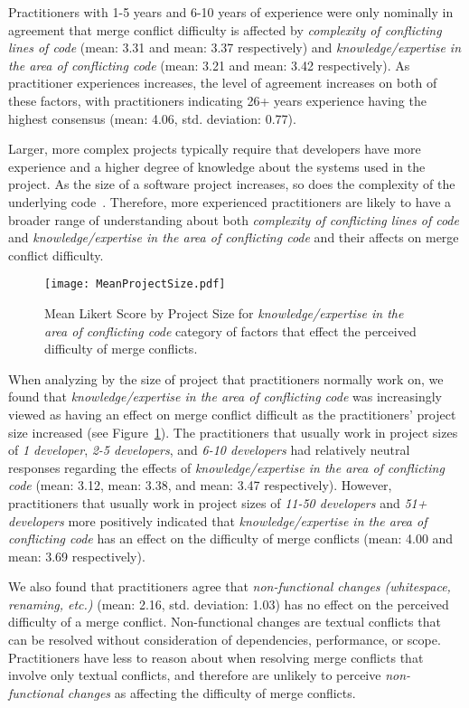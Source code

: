 Practitioners with 1-5 years and 6-10 years of experience were only nominally in agreement that merge conflict difficulty is affected by \textit{complexity of conflicting lines of code} (mean: 3.31 and mean: 3.37 respectively) and \textit{knowledge/expertise in the area of conflicting code} (mean: 3.21 and mean: 3.42 respectively).
As practitioner experiences increases, the level of agreement increases on both of these factors, with practitioners indicating 26+ years experience having the highest consensus (mean: 4.06, std. deviation: 0.77). 

Larger, more complex projects typically require that developers have more experience and a higher degree of knowledge about the systems used in the project.
As the size of a software project increases, so does the complexity of the underlying code~\cite{banker1993software}\cite{curtis1979third}.
Therefore, more experienced practitioners are likely to have a broader range of understanding about both \textit{complexity of conflicting lines of code} and \textit{knowledge/expertise in the area of conflicting code} and their affects on merge conflict difficulty.

\begin{figure}[!t]
\centering
\texttt{[image: MeanProjectSize.pdf]}
\caption{Mean Likert Score by Project Size for \textit{knowledge/expertise in the area of conflicting code} category of factors that effect the perceived difficulty of merge conflicts.}
\label{mean_likert_project_size}
\end{figure}

When analyzing by the size of project that practitioners normally work on, we found that \textit{knowledge/expertise in the area of conflicting code} was increasingly viewed as having an effect on merge conflict difficult as the practitioners' project size increased (see Figure~\ref{mean_likert_project_size}).
The practitioners that usually work in project sizes of \textit{1 developer}, \textit{2-5 developers}, and \textit{6-10 developers} had relatively neutral responses regarding the effects of \textit{knowledge/expertise in the area of conflicting code} (mean: 3.12, mean: 3.38, and mean: 3.47 respectively).
However, practitioners that usually work in project sizes of \textit{11-50 developers} and \textit{51+ developers} more positively indicated that \textit{knowledge/expertise in the area of conflicting code} has an effect on the difficulty of merge conflicts (mean: 4.00 and mean: 3.69 respectively).

We also found that practitioners agree that \textit{non-functional changes (whitespace, renaming, etc.)} (mean: 2.16, std. deviation: 1.03) has no effect on the perceived difficulty of a merge conflict.
Non-functional changes are textual conflicts that can be resolved without consideration of dependencies, performance, or scope.
Practitioners have less to reason about when resolving merge conflicts that involve only textual conflicts, and therefore are unlikely to perceive \textit{non-functional changes} as affecting the difficulty of merge conflicts.

